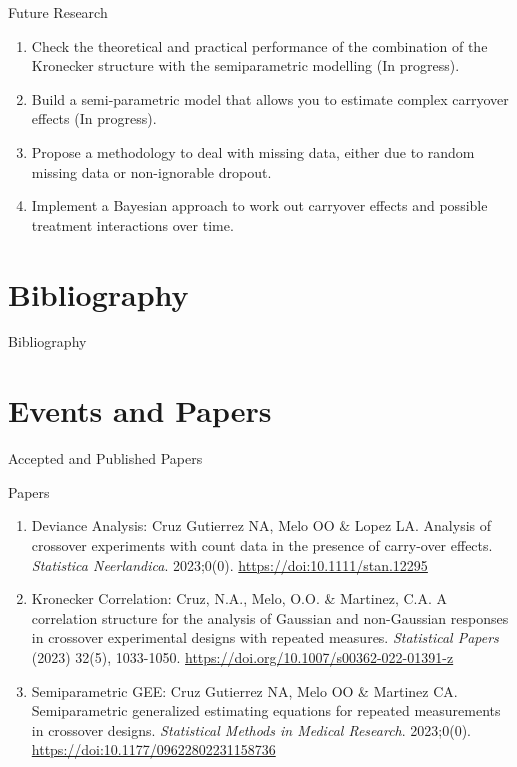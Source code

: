 \documentclass[t,9pt]{beamer}
\begin{document}
\begin{frame}[fragile]{Future Research}
\vfill
    \begin{enumerate}
\item  Check the theoretical and practical performance of the combination of the Kronecker structure with the semiparametric modelling (In progress).
\item Build a semi-parametric model that allows you to estimate complex carryover effects (In progress).
\item Propose a methodology to deal with missing data, either due to random missing data or non-ignorable dropout.
\item Implement a Bayesian approach to work out carryover effects and possible treatment interactions over time.

\end{enumerate}
\end{frame}


\section*{Bibliography}
\begin{frame}[allowframebreaks]{Bibliography}
  
\end{frame}

\section{Events and Papers}
\begin{frame}[fragile]{Accepted and Published Papers}
\vfill
\begin{block}{Papers}
\begin{enumerate}
    \item Deviance Analysis:  \citep{cruz2023gee} Cruz Gutierrez NA, Melo OO \& Lopez LA. Analysis of crossover experiments with count data in the presence of carry-over effects. \textit{Statistica Neerlandica}. 2023;0(0). \url{https://doi:10.1111/stan.12295}
\item Kronecker Correlation:    \citep{cruz2023correlation} Cruz, N.A., Melo, O.O. \& Martinez, C.A. A correlation structure for the analysis of Gaussian and non-Gaussian responses in crossover experimental designs with repeated measures. \textit{Statistical Papers} (2023) 32(5), 1033-1050. \url{https://doi.org/10.1007/s00362-022-01391-z}
\item Semiparametric GEE:    \citep{cruz2023semiparametric} Cruz Gutierrez NA, Melo OO \& Martinez CA. Semiparametric generalized estimating equations for repeated measurements in crossover designs. \textit{Statistical Methods in Medical Research}. 2023;0(0). \url{https://doi:10.1177/09622802231158736}
\end{enumerate}
\end{block}

\end{frame}
\end{document}
